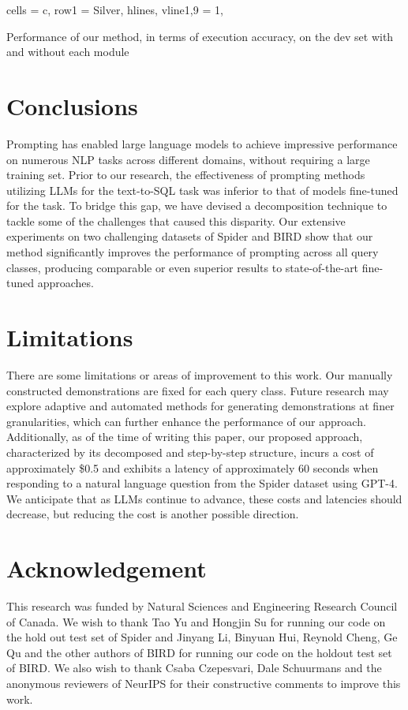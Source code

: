 \begin{table}
\begin{adjustbox}{width=11cm,center}
\begin{tblr}{
  cells = {c},
  row{1} = {Silver},
  hlines,
  vline{1,9} = {1}{},
}
\end{tblr}
\end{adjustbox}
\caption{Performance of our method, in terms of execution accuracy, on the dev set with and without each module}
 \label{tab:5}
\end{table}

\section{Conclusions}
Prompting has enabled large language models to achieve impressive performance on numerous NLP tasks across different domains, without requiring a large training set.
Prior to our research, the effectiveness of prompting methods utilizing LLMs for the text-to-SQL task was inferior to that of models fine-tuned for the task. To bridge this gap, we have devised a decomposition technique to tackle some of the challenges that caused this disparity. Our extensive experiments on two challenging datasets of Spider and BIRD show that our method significantly improves the performance of prompting across all query classes, producing comparable or even superior results to state-of-the-art fine-tuned approaches.

\section{Limitations}
There are some limitations or areas of improvement to this work. Our manually constructed demonstrations are fixed for each query class. Future research may explore adaptive and automated methods for generating demonstrations at finer granularities, which can further enhance the performance of our approach. Additionally, as of the time of writing this paper, our proposed approach, characterized by its decomposed and step-by-step structure, incurs a cost of approximately \$0.5 and exhibits a latency of approximately 60 seconds when responding to a natural language question from the Spider dataset using GPT-4. We anticipate that as LLMs continue to advance, these costs and latencies should decrease, but reducing the cost is another possible direction.

\section*{Acknowledgement}
This research was funded by Natural Sciences and Engineering Research Council of Canada. We wish to thank Tao Yu and Hongjin Su for running our code on the hold out test set of Spider and Jinyang Li, Binyuan Hui, Reynold Cheng, Ge Qu and the other authors of BIRD for running our code on the holdout test set of BIRD. We also wish to thank Csaba Czepesvari, Dale Schuurmans and the anonymous reviewers of NeurIPS for their constructive comments to improve this work.

\newpage

